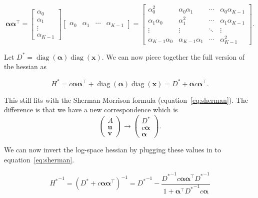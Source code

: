 \documentclass[twoside]{article}
\begin{document}
\[
\boldsymbol{\alpha} \boldsymbol{\alpha}^\top =
\begin{bmatrix}
    \alpha_0 \\
    \alpha_1 \\
    \vdots \\
    \alpha_{K-1}
\end{bmatrix}
\begin{bmatrix}
    \alpha_0 & \alpha_1 & \cdots & \alpha_{K-1}
\end{bmatrix} =
\begin{bmatrix}
    \alpha_0^2 & \alpha_0\alpha_1 & \cdots & \alpha_0\alpha_{K-1} \\
    \alpha_1\alpha_0 & \alpha_1^2 & \cdots & \alpha_1\alpha_{K-1} \\
    \vdots & \vdots & \ddots & \vdots \\
    \alpha_{K-1}\alpha_0 & \alpha_{K-1}\alpha_1 & \cdots & \alpha_{K-1}^2
\end{bmatrix}.
\]

Let ${D^*} = \operatorname{diag}(\boldsymbol{\alpha})\operatorname{diag}(\boldsymbol{x})$. We can now piece together the full version of the hessian as

\[
H^* = c \boldsymbol{\alpha} \boldsymbol{\alpha}^\top + \operatorname{diag}(\boldsymbol{\alpha})\operatorname{diag}(\boldsymbol{x}) = D^* + \boldsymbol{\alpha} c \boldsymbol{\alpha}^\top.
\]

This still fits with the Sherman-Morrison formula (equation~\ref{eq:sherman}). The difference is that we have a new correspondence which is
\[
    \begin{pmatrix}
        A \\
        \boldsymbol{u} \\
        \boldsymbol{v}
    \end{pmatrix}
    \rightarrow
    \begin{pmatrix}
        D^* \\
        c \boldsymbol{\alpha} \\
        \boldsymbol{\alpha}
    \end{pmatrix}.
\]

We can now invert the log-space hessian by plugging these values in to equation~\ref{eq:sherman}. 

\[
{H^*}^{-1} = \left(D^* +  c \boldsymbol{\alpha} \boldsymbol{\alpha}^\top\right)^{-1} = {D^*}^{-1} - \frac{{D^*}^{-1}c \boldsymbol{\alpha} \boldsymbol{\alpha}^{\top}{D^*}^{-1}}{1 + \boldsymbol{\alpha}^{\top}{D^*}^{-1}c \boldsymbol{\alpha} }
\]
\end{document}
